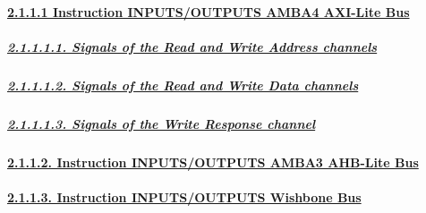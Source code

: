 \documentclass[
]{article}
\begin{document}
\hypertarget{instruction-inputsoutputs-amba4-axi-lite-bus}{%
\paragraph{\texorpdfstring{\protect\hyperlink{instruction-inputsoutputs-amba4-axi-lite-bus-1}{2.1.1.1
Instruction INPUTS/OUTPUTS AMBA4 AXI-Lite
Bus}}{2.1.1.1 Instruction INPUTS/OUTPUTS AMBA4 AXI-Lite Bus}}\label{instruction-inputsoutputs-amba4-axi-lite-bus}}

\hypertarget{signals-of-the-read-and-write-address-channels}{%
\subparagraph{\texorpdfstring{\protect\hyperlink{signals-of-the-read-and-write-address-channels-2}{2.1.1.1.1.
Signals of the Read and Write Address
channels}}{2.1.1.1.1. Signals of the Read and Write Address channels}}\label{signals-of-the-read-and-write-address-channels}}

\hypertarget{signals-of-the-read-and-write-data-channels}{%
\subparagraph{\texorpdfstring{\protect\hyperlink{signals-of-the-read-and-write-data-channels-2}{2.1.1.1.2.
Signals of the Read and Write Data
channels}}{2.1.1.1.2. Signals of the Read and Write Data channels}}\label{signals-of-the-read-and-write-data-channels}}

\hypertarget{signals-of-the-write-response-channel}{%
\subparagraph{\texorpdfstring{\protect\hyperlink{signals-of-the-write-response-channel-2}{2.1.1.1.3.
Signals of the Write Response
channel}}{2.1.1.1.3. Signals of the Write Response channel}}\label{signals-of-the-write-response-channel}}

\hypertarget{instruction-inputsoutputs-amba3-ahb-lite-bus}{%
\paragraph{\texorpdfstring{\protect\hyperlink{instruction-inputsoutputs-amba3-ahb-lite-bus-1}{2.1.1.2.
Instruction INPUTS/OUTPUTS AMBA3 AHB-Lite
Bus}}{2.1.1.2. Instruction INPUTS/OUTPUTS AMBA3 AHB-Lite Bus}}\label{instruction-inputsoutputs-amba3-ahb-lite-bus}}

\hypertarget{instruction-inputsoutputs-wishbone-bus}{%
\paragraph{\texorpdfstring{\protect\hyperlink{instruction-inputsoutputs-wishbone-bus-1}{2.1.1.3.
Instruction INPUTS/OUTPUTS Wishbone
Bus}}{2.1.1.3. Instruction INPUTS/OUTPUTS Wishbone Bus}}\label{instruction-inputsoutputs-wishbone-bus}}
\end{document}
